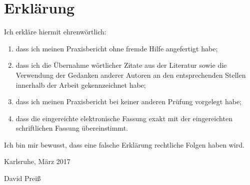\chapter*{Erklärung}
Ich erkläre hiermit ehrenwörtlich: \\
\begin{enumerate}
\item dass ich meinen Praxisbericht ohne fremde Hilfe angefertigt habe;
\item dass ich die Übernahme wörtlicher Zitate aus der Literatur sowie die Verwendung der Gedanken
anderer Autoren an den entsprechenden Stellen innerhalb der Arbeit gekennzeichnet habe;
\item dass ich meinen Praxisbericht bei keiner anderen Prüfung vorgelegt habe;
\item dass die eingereichte elektronische Fassung exakt mit der eingereichten schriftlichen Fassung
übereinstimmt.
\end{enumerate}

Ich bin mir bewusst, dass eine falsche Erklärung rechtliche Folgen haben wird.
\vspace{3em}

Karlsruhe, März 2017
\vspace{4em}

David Preiß